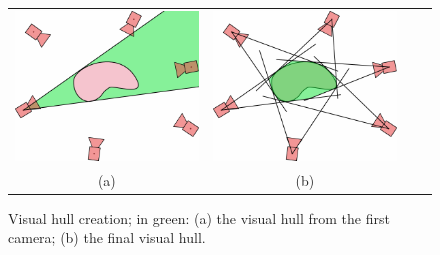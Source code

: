 
\begin{figure}[t]
\centering
 \begin{tabular}{cccc}
  \includegraphics[width=0.45\columnwidth]{./img/ch_soa/visualhull01}&
  \includegraphics[width=0.45\columnwidth]{./img/ch_soa/visualhull02}\\
  (a)&(b)
 \end{tabular}
 \caption{Visual hull creation; in green: (a) the visual hull from the first camera; (b) the final visual hull.}
 \label{fig:visualhull}
\end{figure}

